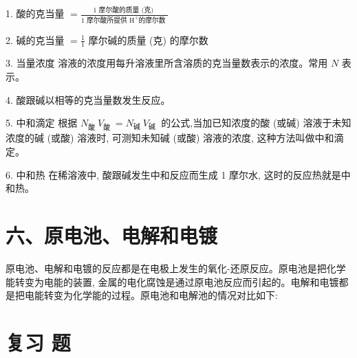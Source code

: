 \documentclass[10pt]{article}
\begin{document}
1. 酸的克当量 \(= \frac{1\text{ 摩尔酸的质量 (克) }}{1\text{ 摩尔酸所提供 }{\mathrm{H}}^{ + }\text{的摩尔数 }}\)

2. 碱的克当量 \(= \frac{1}{1}\) 摩尔碱的质量 (克) 的摩尔数

3. 当量浓度 溶液的浓度用每升溶液里所含溶质的克当量数表示的浓度。常用 \(N\) 表示。

4. 酸跟碱以相等的克当量数发生反应。

5. 中和滴定 根据 \({N}_{\text{酸 }}{V}_{\text{酸 }} = {N}_{\text{碱 }}{V}_{\text{碱 }}\) 的公式,当加已知浓度的酸 (或碱) 溶液于未知浓度的碱 (或酸) 溶液时, 可测知未知碱 (或酸) 溶液的浓度, 这种方法叫做中和滴定。

6. 中和热 在稀溶液中, 酸跟碱发生中和反应而生成 1 摩尔水, 这时的反应热就是中和热。

\section*{六、原电池、电解和电镀}

原电池、电解和电镀的反应都是在电极上发生的氧化-还原反应。原电池是把化学能转变为电能的装置, 金属的电化腐蚀是通过原电池反应而引起的。电解和电镀都是把电能转变为化学能的过程。原电池和电解池的情况对比如下:

\begin{center}
\end{center}

\section*{复习 题}
\end{document}
